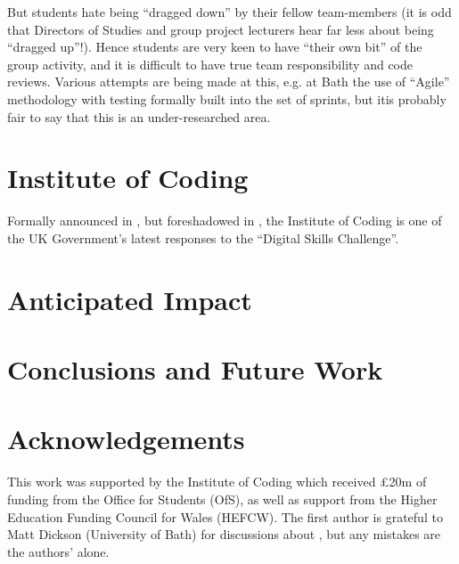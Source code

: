 \documentclass[sigconf]{acmart}
\begin{document}
But students hate being ``dragged down'' by their fellow team-members (it is odd that Directors of Studies and group project lecturers hear far less about being ``dragged up''!).  Hence students are very keen to have ``their own bit'' of the group activity, and it is difficult to have true team responsibility and code reviews.  Various attempts are being made at this, e.g. at Bath the use of ``Agile'' methodology with testing formally built into the  set of sprints, but itis probably fair to say that this is an under-researched area.

\section{Institute of Coding}

Formally announced in \cite{DfE2018a}, but foreshadowed in
\cite{HMG2015a}, the Institute of Coding is one of the UK Government's latest responses to the ``Digital Skills Challenge''.



\section{Anticipated Impact}

\section{Conclusions and Future Work}


\section{Acknowledgements}

This work was supported by the Institute of Coding which received
\pounds20m of funding from the Office for Students (OfS), as well as
support from the Higher Education Funding Council for Wales (HEFCW).
The first author is grateful to Matt Dickson (University of Bath) for
discussions about \cite{DfE2018d}, but any mistakes are the authors'
alone.



 
\end{document}
